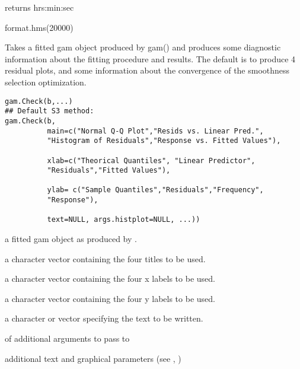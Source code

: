 \documentclass[a4paper]{book}
\begin{document}
%
\begin{Value}
returns hrs:min:sec
\end{Value}
%
\begin{Examples}
\begin{ExampleCode}
format.hms(20000)
\end{ExampleCode}
\end{Examples}
\newpage
{}
%
\begin{Description}\relax
Takes a fitted gam object produced by gam() and produces some diagnostic
information about the fitting procedure and results. The default is to produce
4 residual plots, and some information about the convergence of the smoothness
selection optimization.
\end{Description}
%
\begin{Usage}
\begin{verbatim}
gam.Check(b,...)
## Default S3 method:
gam.Check(b,
          main=c("Normal Q-Q Plot","Resids vs. Linear Pred.",
          "Histogram of Residuals","Response vs. Fitted Values"),

          xlab=c("Theorical Quantiles", "Linear Predictor",
          "Residuals","Fitted Values"),

          ylab= c("Sample Quantiles","Residuals","Frequency",
          "Response"),
          
          text=NULL, args.histplot=NULL, ...))
\end{verbatim}
\end{Usage}
%
\begin{Arguments}
\begin{ldescription}
\item[\code{b}] a fitted gam object as produced by .
\item[\code{main}] a character vector containing the four titles to be used.
\item[\code{xlab}] a character vector containing the four x labels to be used.
\item[\code{ylab}] a character vector containing the four y labels to be used.
\item[\code{text}] a character or  vector specifying the text to be written.
\item[\code{args.histplot}]  of additional arguments to pass to 
\item[\code{...}] additional text and graphical parameters (see , )
\end{ldescription}
\end{Arguments}
\end{document}
